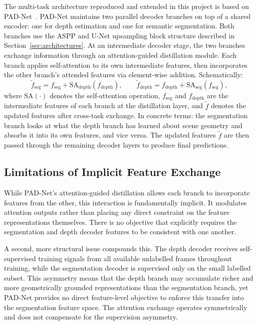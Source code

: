 The multi-task architecture reproduced and extended in this project is
based on PAD-Net~\cite{xu2018pad}. PAD-Net maintains two parallel decoder
branches on top of a shared encoder: one for depth estimation and one
for semantic segmentation. Both branches use the ASPP and U-Net
upsampling block structure described in Section~\ref{sec:architectures}.
At an intermediate decoder stage, the two branches exchange information
through an attention-guided distillation module. Each branch applies
self-attention to its own intermediate features, then incorporates the
other branch's attended features via element-wise addition. Schematically:
\[
    \tilde{f}_\text{seg}   = f_\text{seg}   +
        \mathrm{SA}_\text{depth}(f_\text{depth}),
    \qquad
    \tilde{f}_\text{depth} = f_\text{depth} +
        \mathrm{SA}_\text{seg}(f_\text{seg}),
\]
where $\mathrm{SA}(\cdot)$ denotes the self-attention operation,
$f_\text{seg}$ and $f_\text{depth}$ are the intermediate features of
each branch at the distillation layer, and $\tilde{f}$ denotes the
updated features after cross-task exchange. In concrete terms: the
segmentation branch looks at what the depth branch has learned about
scene geometry and absorbs it into its own features, and vice versa. The
updated features $\tilde{f}$ are then passed through the remaining
decoder layers to produce final predictions.

\subsection{Limitations of Implicit Feature Exchange}

While PAD-Net's attention-guided distillation allows each branch to
incorporate features from the other, this interaction is fundamentally
implicit. It modulates attention outputs rather than placing any
direct constraint on the feature representations themselves. There is no
objective that explicitly requires the segmentation and depth decoder
features to be consistent with one another.

A second, more structural issue compounds this. The depth decoder
receives self-supervised training signals from all available unlabelled
frames throughout training, while the segmentation decoder is supervised
only on the small labelled subset. This asymmetry means that the depth
branch may accumulate richer and more geometrically grounded representations
than the segmentation branch, yet PAD-Net provides no direct feature-level
objective to enforce this transfer into the segmentation feature space.
The attention exchange operates symmetrically and does not compensate for
the supervision asymmetry.

